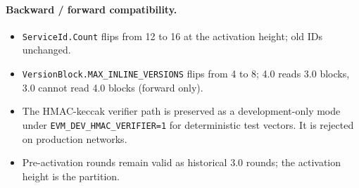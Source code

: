 \paragraph{Backward / forward compatibility.}
\begin{itemize}[leftmargin=2em]
\item \texttt{ServiceId.Count} flips from 12 to 16 at the activation
      height; old IDs unchanged.
\item \texttt{VersionBlock.MAX\_INLINE\_VERSIONS} flips from 4 to 8;
      4.0 reads 3.0 blocks, 3.0 cannot read 4.0 blocks (forward only).
\item The HMAC-keccak verifier path is preserved as a
      development-only mode under \texttt{EVM\_DEV\_HMAC\_VERIFIER=1}
      for deterministic test vectors. It is rejected on production
      networks.
\item Pre-activation rounds remain valid as historical 3.0 rounds; the
      activation height is the partition.
\end{itemize}

